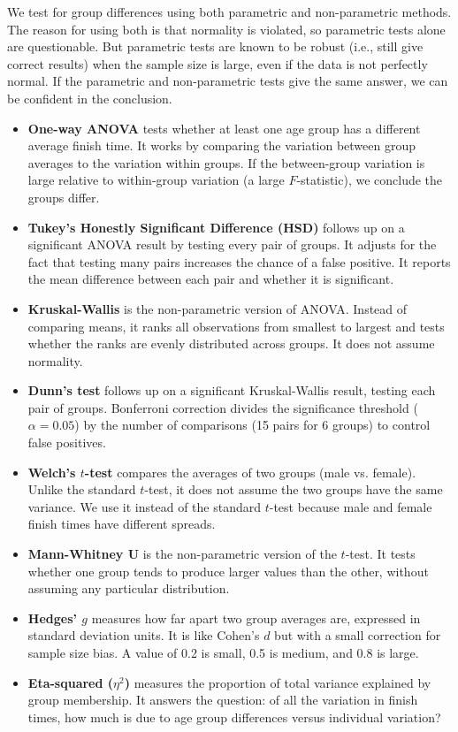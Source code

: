 \documentclass[conference]{IEEEtran}
\begin{document}
We test for group differences using both parametric and non-parametric methods. The reason for using both is that normality is violated, so parametric tests alone are questionable. But parametric tests are known to be robust (i.e., still give correct results) when the sample size is large, even if the data is not perfectly normal. If the parametric and non-parametric tests give the same answer, we can be confident in the conclusion.

\begin{itemize}
    \item \textbf{One-way ANOVA} tests whether at least one age group has a different average finish time. It works by comparing the variation between group averages to the variation within groups. If the between-group variation is large relative to within-group variation (a large $F$-statistic), we conclude the groups differ.

    \item \textbf{Tukey's Honestly Significant Difference (HSD)} follows up on a significant ANOVA result by testing every pair of groups. It adjusts for the fact that testing many pairs increases the chance of a false positive. It reports the mean difference between each pair and whether it is significant.

    \item \textbf{Kruskal-Wallis} is the non-parametric version of ANOVA. Instead of comparing means, it ranks all observations from smallest to largest and tests whether the ranks are evenly distributed across groups. It does not assume normality.

    \item \textbf{Dunn's test} follows up on a significant Kruskal-Wallis result, testing each pair of groups. Bonferroni correction divides the significance threshold ($\alpha = 0.05$) by the number of comparisons (15 pairs for 6 groups) to control false positives.

    \item \textbf{Welch's $t$-test} compares the averages of two groups (male vs. female). Unlike the standard $t$-test, it does not assume the two groups have the same variance. We use it instead of the standard $t$-test because male and female finish times have different spreads.

    \item \textbf{Mann-Whitney U} is the non-parametric version of the $t$-test. It tests whether one group tends to produce larger values than the other, without assuming any particular distribution.

    \item \textbf{Hedges' $g$} measures how far apart two group averages are, expressed in standard deviation units. It is like Cohen's $d$ but with a small correction for sample size bias. A value of 0.2 is small, 0.5 is medium, and 0.8 is large.

    \item \textbf{Eta-squared ($\eta^2$)} measures the proportion of total variance explained by group membership. It answers the question: of all the variation in finish times, how much is due to age group differences versus individual variation?
\end{itemize}
\end{document}
